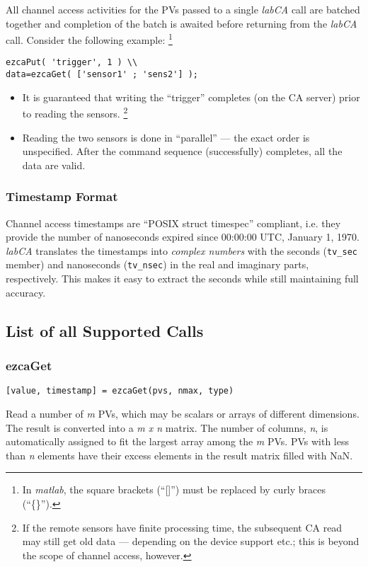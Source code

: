\documentclass{article}
\newcommand{\sca}{\ita{labCA}}
\newcommand{\matlab}{\ita{matlab}}
\newcommand{\com}[1]{{\tt #1}}
\newcommand{\NAN}{\mbox{NaN}}
\newcommand{\ita}[1]{\emph{#1}}
\newcommand{\m}{$m$}
\newcommand{\n}{$n$}
\newcommand{\mxn}{$m\times n$}
\renewcommand{\m}{\ita{m}}
\renewcommand{\n}{\ita{n}}
\renewcommand{\mxn}{\ita{m x n}}
\begin{document}
All channel access activities for the PVs
passed to a single \sca{} call are batched together and
completion of the batch is awaited before returning from
the \sca{} call. Consider the following example:%
\footnote{
In \matlab{}, the square brackets (``[]'') must be replaced
by curly braces (``\{\}'').}
\begin{verbatim}
ezcaPut( 'trigger', 1 ) \\
data=ezcaGet( ['sensor1' ; 'sens2'] );
\end{verbatim}
\begin{itemize}
%
\item It is guaranteed that writing the ``trigger''
completes (on the CA server) prior to reading the
sensors.%
\footnote{If the remote sensors have finite
processing time, the subsequent CA read may still
get old data --- depending on the device support
etc.; this is beyond the scope of channel access, however.}
%
\item Reading the two sensors is done in ``parallel'' ---
the exact order is unspecified. After the command sequence
(successfully) completes, all the data are valid.
\end{itemize}

\subsubsection{Timestamp Format}
\label{tsformat}
Channel access timestamps are ``POSIX struct timespec''
compliant, i.e. they provide the number of nanoseconds
expired since 00:00:00 UTC, January 1, 1970. \sca{} 
translates the timestamps into \ita{complex numbers}
with the seconds (\com{tv\_sec} member) and nanoseconds
(\com{tv\_nsec}) in the real and imaginary parts, respectively.
This makes it easy to extract the seconds while still maintaining
full accuracy.

\vspace*{\fill}

\subsection{List of all Supported Calls}
\subsubsection{ezcaGet}
\label{ezcaget}
\begin{verbatim}
[value, timestamp] = ezcaGet(pvs, nmax, type)
\end{verbatim}
Read a number of \m{} PVs, which may be scalars or arrays of
different dimensions. The result is converted into a \mxn{}
matrix. The number of columns, \n, is automatically assigned
to fit the largest array among the \m{} PVs.  PVs with less than
\n{} elements have their excess elements in the result matrix
filled with \NAN.
\end{document}
